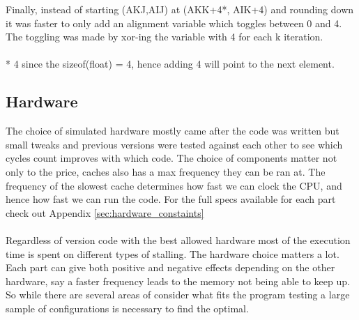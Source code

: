 \documentclass{article}
\begin{document}
Finally, instead of starting (AKJ,AIJ) at (AKK+4*, AIK+4) and rounding down it was faster to only add an alignment variable which toggles between 0 and 4. The toggling was made by xor-ing the variable with 4 for each k iteration.
\\\\
* 4 since the sizeof(float) = 4, hence adding 4 will point to the next element.

\subsection{Hardware}
The choice of simulated hardware mostly came after the code was written but small tweaks and previous versions were tested against each other to see which cycles count improves with which code. The choice of components matter not only to the price, caches also has a max frequency they can be ran at. The frequency of the slowest cache determines how fast we can clock the CPU, and hence how fast we can run the code. For the full specs available for each part check out Appendix \ref{sec:hardware_constaints}
\\\\
Regardless of version code with the best allowed hardware most of the execution time is spent on different types of stalling. The hardware choice matters a lot. Each part can give both positive and negative effects depending on the other hardware, say a faster frequency leads to the memory not being able to keep up. So while there are several areas of consider what fits the program testing a large sample of configurations is necessary to find the optimal.
\end{document}
